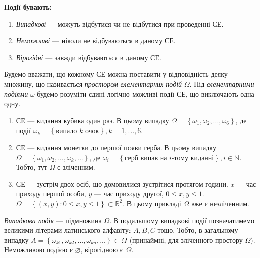 \noindent \textbf{Події бувають:}
\begin{enumerate}
    \item \emph{Випадкові} --- можуть відбутися чи не відбутися при проведенні СЕ.
    \item \emph{Неможливі} --- ніколи не відбуваються в даному СЕ.
    \item \emph{Вірогідні} --- завжди відбуваються в даному СЕ.
\end{enumerate}
\begin{definition}
    Будемо вважати, що кожному СЕ можна поставити у відповідність деяку множину, що
    називається \emph{простором елементарних подій} $\Omega$. 
    Під \emph{елементарними подіями} $\omega$ будемо розуміти єдині
    логічно можливі події СЕ, що виключають одна одну.
\end{definition}
\begin{example}
    \begin{enumerate}
        \item СЕ --- кидання кубика один раз. В цьому випадку
        $\Omega = \left\{\omega_1, \omega_2, ..., \omega_6\right\}$, 
        де події 
        $\omega_k = \left\{\text{випало } k \text{ очок}\right\}, k = 1,...,6$.
        \item СЕ --- кидання монетки до першої появи герба. В цьому випадку
        $\Omega = \left\{\omega_1, \omega_2, ..., \omega_k, ...\right\}$,  
        де $\omega_i = \left\{\text{герб випав на }i\text{-тому киданні}\right\}, i\in \mathbb{N}$.
        Тобто, тут $\Omega$ є зліченним.
        \item СЕ --- зустріч двох осіб, що домовилися зустрітися протягом години.
        $x$ --- час приходу першої особи, $y$ --- час приходу другої, $0\leq x, y \leq 1$.
        $\Omega = \left\{ \left( x, y\right): 0\leq x, y \leq 1\right\}\subset \mathbb{R}^2$.
        В цьому прикладі $\Omega$ вже є незліченним.
    \end{enumerate}
\end{example}
\begin{definition}
    \emph{Випадкова подія} --- підмножина $\Omega$. В подальшому випадкові події позначатимемо великими літерами латинського алфавіту: $A, B, C$ тощо.
    Тобто, в загальному випадку $A = \left\{\omega_{k1}, \omega_{k2}, ..., \omega_{kn}, ...\right\} \subset \Omega$
    (принаймні, для зліченного простору $\Omega$).
    Неможливою подією є $\varnothing$, вірогідною є $\Omega$. 
\end{definition}

